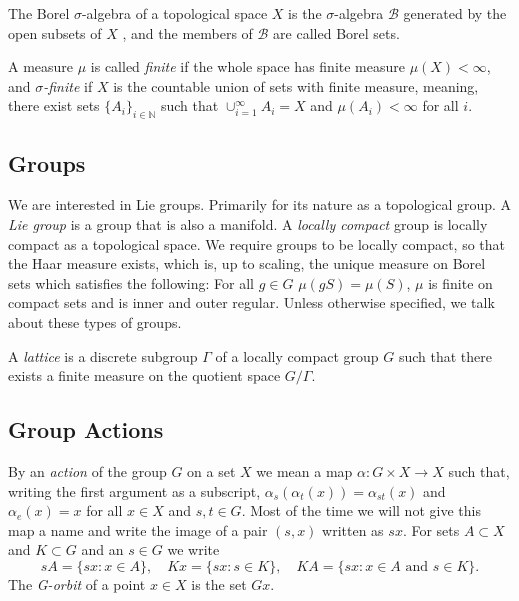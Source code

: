 \documentclass[
  12pt
]{article}
\theoremstyle{break}
\theoremstyle{plain}
\begin{document}
  The Borel $\sigma$-algebra of a topological space $X$ is the
  $\sigma$-algebra $\mathscr{B}$ generated by the open subsets of
  $X$ , and the members of $\mathscr{B}$ are called Borel sets. 

  A measure $\mu$ is called \emph{finite} if the whole space has finite measure $\mu(X) < \infty $,
  and \emph{$\sigma$-finite} if $X$ is the countable union of sets with finite measure,
  meaning, there exist sets $\{A_i\}_{i\in \mathbb{N}}$ such that $\cup_{i=1}^{\infty} A_i = X$ and
  $\mu(A_i) < \infty $ for all $i$.




  \hypertarget{groups}{%
  \subsection{Groups}\label{groups}}

  We are interested in Lie groups. Primarily for its nature as a topological group.
  A \emph{ Lie group } is a group that is also a manifold. A \emph{locally compact} group
  is locally compact as a topological space.
  We require groups to be locally compact, so that the Haar measure exists, which is, up to scaling,
  the unique measure on Borel sets which satisfies the following: For all $g\in G$
  $\mu(gS) = \mu(S)$, $\mu$ is finite on compact sets and is inner and outer
  regular.
  Unless otherwise specified, we talk about these types of groups.

  A \emph{lattice} is a discrete subgroup $\Gamma$ of a locally compact group $G$
  such that there exists a finite measure on the quotient space $G/\Gamma$.


  \hypertarget{group-actions}{
  \subsection{Group Actions}\label{group-actions}}

  By an \emph{action} of the group $G$ on a set $X$ we mean a
  map $\alpha: G \times X \rightarrow X$ such that, writing the first
  argument as a subscript, $\alpha_s(\alpha_t(x)) = \alpha_{st}(x)$ and
  $\alpha_e(x) = x$ for all $x \in X$ and $s, t \in G$.
  Most of the time we will not give this map a name and write the image of a pair
  $(s, x)$ written as $sx$. For sets $A \subset X$ and $K \subset G$
  and an $s \in G$ we write
  $$
  s A = \{sx : x \in A\},
  \quad
  K x = \{sx : s \in K \},
  \quad
  K A = \{sx : x \in A \text{ and } s \in K \}.
  $$
  The \emph{G-orbit} of a point $x \in X$ is the set $Gx$.
\end{document}
